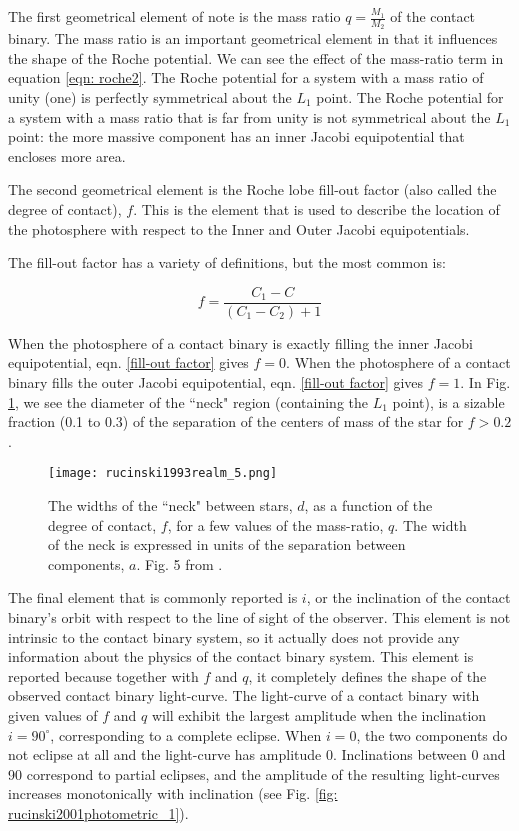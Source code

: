 \documentclass[12pt]{article} %
\numberwithin{equation}{section} %
\begin{document}
The first geometrical element of note is the mass ratio $q = \frac{M_{1}}{M_{2}}$ of the contact binary. The mass ratio is an important geometrical element in that it influences the shape of the Roche potential. We can see the effect of the mass-ratio term in equation \ref{eqn: roche2}. The Roche potential for a system with a mass ratio of unity (one) is perfectly symmetrical about the $L_{1}$ point. The Roche potential for a system with a mass ratio that is far from unity is not symmetrical about the $L_{1}$ point: the more massive component has an inner Jacobi equipotential that encloses more area.

The second geometrical element is the Roche lobe fill-out factor (also called the degree of contact), $f$. This is the element that is used to describe the location of the photosphere with respect to the Inner and Outer Jacobi equipotentials.

The fill-out factor has a variety of definitions, but the most common is:

\begin{equation} \label{fill-out factor}
f = \frac{C_{1} - C}{(C_{1} - C_{2}) + 1}
\end{equation}

When the photosphere of a contact binary is exactly filling the inner Jacobi equipotential, eqn. \ref{fill-out factor} gives $f = 0$. When the photosphere of a contact binary fills the outer Jacobi equipotential, eqn. \ref{fill-out factor} gives $f = 1$. In Fig. \ref{fig: rucinski1993realm_5}, we see the diameter of the ``neck" region (containing the $L_{1}$ point), is a sizable fraction (0.1 to 0.3) of the separation of the centers of mass of the star for $f > 0.2$.

\begin{figure}[H]
\centering
\texttt{[image: rucinski1993realm\_5.png]}
\caption{The widths of the ``neck" between stars, $d$, as a function of the degree of contact, $f$, for a few values of the mass-ratio, $q$. The width of the neck is expressed in units of the separation between components, $a$. Fig. 5 from \citet{rucinski1993realm}.}
\label{fig: rucinski1993realm_5}
\end{figure}

The final element that is commonly reported is $i$, or the inclination of the contact binary's orbit with respect to the line of sight of the observer. This element is not intrinsic to the contact binary system, so it actually does not provide any information about the physics of the contact binary system. This element is reported because together with $f$ and $q$, it completely defines the shape of the observed contact binary light-curve. The light-curve of a contact binary with given values of $f$ and $q$ will exhibit the largest amplitude when the inclination $i = 90^{\circ}$, corresponding to a complete eclipse. When $i = 0$, the two components do not eclipse at all and the light-curve has amplitude 0. Inclinations between 0 and 90 correspond to partial eclipses, and the amplitude of the resulting light-curves increases monotonically with inclination (see Fig. \ref{fig: rucinski2001photometric_1}).
\end{document}
